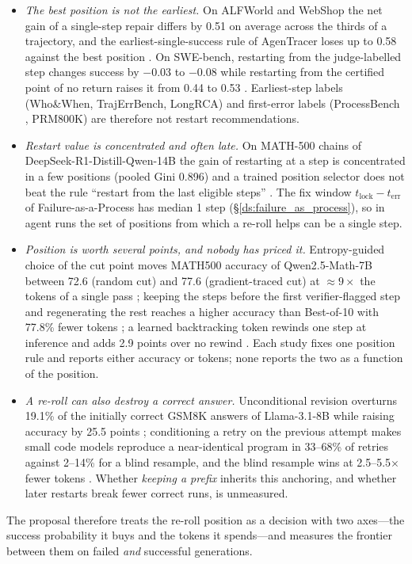 \documentclass[10pt,a4paper]{article}
\begin{document}
\begin{itemize}[leftmargin=1.1em]
\item \emph{The best position is not the earliest.} On ALFWorld and WebShop the net gain of a single-step repair differs by 0.51 on average across the thirds of a trajectory, and the earliest-single-success rule of AgenTracer loses up to 0.58 against the best position \cite{liao2026repairs}. On SWE-bench, restarting from the judge-labelled step changes success by $-0.03$ to $-0.08$ while restarting from the certified point of no return raises it from 0.44 to 0.53 \cite{shen2026epv}. Earliest-step labels (Who\&When, TrajErrBench, LongRCA) and first-error labels (ProcessBench \cite{zheng2024processbench}, PRM800K) are therefore not restart recommendations.
\item \emph{Restart value is concentrated and often late.} On MATH-500 chains of DeepSeek-R1-Distill-Qwen-14B the gain of restarting at a step is concentrated in a few positions (pooled Gini 0.896) and a trained position selector does not beat the rule ``restart from the last eligible steps'' \cite{atri2026expanding}. The fix window $t_{\mathrm{lock}}-t_{\mathrm{err}}$ of Failure-as-a-Process has median 1 step (\S\ref{ds:failure_as_process}), so in agent runs the set of positions from which a re-roll helps can be a single step.
\item \emph{Position is worth several points, and nobody has priced it.} Entropy-guided choice of the cut point moves MATH500 accuracy of Qwen2.5-Math-7B between 72.6 (random cut) and 77.6 (gradient-traced cut) at $\approx9\times$ the tokens of a single pass \cite{ding2026rewind}; keeping the steps before the first verifier-flagged step and regenerating the rest reaches a higher accuracy than Best-of-10 with 77.8\% fewer tokens \cite{wu2024stepco}; a learned backtracking token rewinds one step at inference and adds 2.9 points over no rewind \cite{yang2025selfbacktrack}. Each study fixes one position rule and reports either accuracy or tokens; none reports the two as a function of the position.
\item \emph{A re-roll can also destroy a correct answer.} Unconditional revision overturns 19.1\% of the initially correct GSM8K answers of Llama-3.1-8B while raising accuracy by 25.5 points \cite{zhang2026riskaware}; conditioning a retry on the previous attempt makes small code models reproduce a near-identical program in 33--68\% of retries against 2--14\% for a blind resample, and the blind resample wins at 2.5--5.5$\times$ fewer tokens \cite{verma2026tryagain}. Whether \emph{keeping a prefix} inherits this anchoring, and whether later restarts break fewer correct runs, is unmeasured.
\end{itemize}
The proposal therefore treats the re-roll position as a decision with two axes---the success probability it buys and the tokens it spends---and measures the frontier between them on failed \emph{and} successful generations.
\end{document}
